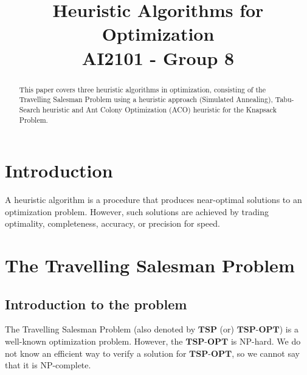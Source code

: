 \documentclass[conference]{IEEEtran}
\begin{document}
\title{\huge{Heuristic Algorithms for Optimization}\\{AI2101 - Group 8}}


\author{

\and


\and

}

\maketitle

\begin{abstract}
This paper covers three heuristic algorithms in optimization, consisting of the Travelling Salesman Problem using a heuristic approach (Simulated Annealing), Tabu-Search heuristic and Ant Colony Optimization (ACO) heuristic for the Knapsack Problem. 
\end{abstract}

\section{\textbf{Introduction}}
A heuristic algorithm is a procedure that produces near-optimal solutions to an optimization problem. 
However, such solutions are achieved by trading optimality, completeness, accuracy, or precision for speed.


\section{\textbf{The Travelling Salesman Problem}}

\subsection{Introduction to the problem }
The Travelling Salesman Problem (also denoted by $\textbf{TSP}$ (or) $\textbf{TSP-OPT}$) is a well-known optimization problem. However, the $\textbf{TSP-OPT}$ is NP-hard. We do not know an efficient way to verify a solution for $\textbf{TSP-OPT}$, so we cannot say that it is NP-complete. 
\end{document}
